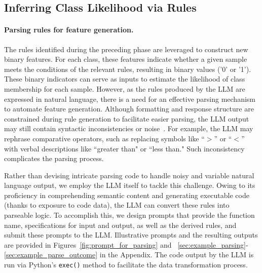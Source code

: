 \subsection{Inferring Class Likelihood via Rules}
\label{Sec:training}

\paragraph{Parsing rules for feature generation.} The rules identified during the preceding phase are leveraged to construct new binary features. For each class, these features indicate whether a given sample meets the conditions of the relevant rules, resulting in binary values ('0' or '1'). These binary indicators can serve as inputs to estimate the likelihood of class membership for each sample. However, as the rules produced by the LLM are expressed in natural language, there is a need for an effective parsing mechanism to automate feature generation. Although formatting and response structure are constrained during rule generation to facilitate easier parsing, the LLM output may still contain syntactic inconsistencies or noise~\cite{kovavc2023large}. For example, the LLM may rephrase comparative operators, such as replacing symbols like ``$>$” or ``$<$” with verbal descriptions like ``greater than" or ``less than." Such inconsistency complicates the parsing process.

Rather than devising intricate parsing code to handle noisy and variable natural language output, we employ the LLM itself to tackle this challenge. Owing to its proficiency in comprehending semantic content and generating executable code (thanks to exposure to code data), the LLM can convert these rules into parseable logic. To accomplish this, we design prompts that provide the function name, specifications for input and output, as well as the derived rules, and submit these prompts to the LLM. Illustrative prompts and the resulting outputs are provided in Figures~\ref{fig:prompt_for_parsing} and ~\ref{sec:example_parsing}-\ref{sec:example_parse_outcome} in the Appendix. The code output by the LLM is run via Python’s \texttt{exec()} method to facilitate the data transformation process.

\vspace*{-0.12in}
